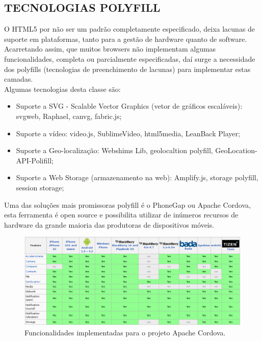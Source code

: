 \documentclass{article}
\begin{document}
\subsection{TECNOLOGIAS POLYFILL}

O HTML5 por não ser um padrão completamente especificado, deixa lacunas de suporte em plataformas, tanto para a gestão de hardware quanto de software. Acarretando assim, que muitos browsers não implementam algumas funcionalidades, completa ou parcialmente especificadas, daí surge a necessidade dos polyfills (tecnologias de preenchimento de lacunas) para implementar estas camadas.
\\
Algumas tecnologias desta classe são:

\begin{itemize}
    \item Suporte a SVG - Scalable Vector Graphics (vetor de gráficos escaláveis): svgweb, Raphael, canvg, fabric.js;

    \item Suporte a vídeo: video.js, SublimeVideo, html5media, LeanBack Player;

    \item Suporte a Geo-localização: Webshims Lib, geolocaltion polyfill, GeoLocation-API-Polifill;

    \item Suporte a Web Storage (armazenamento na web): Amplify.js, storage polyfill, session storage;
\end{itemize}

Uma das soluções mais promissoras polyfill é o PhoneGap ou Apache Cordova, esta ferramenta é open source e possibilita utilizar de inúmeros recursos de hardware da grande maioria das produtoras de dispositivos móveis.


\begin{figure}[!htbp]
    \begin{center}
        \includegraphics[width=\textwidth]{asset/img/cordovaFeatures.jpg}
               \caption{Funcionalidades implementadas para o projeto Apache Cordova.\label{fig:Cordova}}
    \end{center}
\end{figure}
\end{document}
